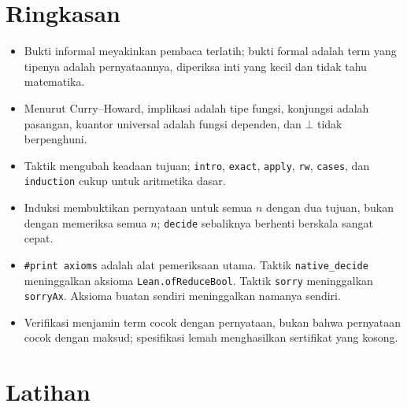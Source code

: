 \section{Ringkasan}

\begin{ringkasan}
\begin{itemize}
  \item Bukti informal meyakinkan pembaca terlatih; bukti formal adalah term yang tipenya adalah
        pernyataannya, diperiksa inti yang kecil dan tidak tahu matematika.
  \item Menurut Curry--Howard, implikasi adalah tipe fungsi, konjungsi adalah pasangan, kuantor
        universal adalah fungsi dependen, dan $\bot$ tidak berpenghuni.
  \item Taktik mengubah keadaan tujuan; \texttt{intro}, \texttt{exact}, \texttt{apply},
        \texttt{rw}, \texttt{cases}, dan \texttt{induction} cukup untuk aritmetika dasar.
  \item Induksi membuktikan pernyataan untuk semua $n$ dengan dua tujuan, bukan dengan memeriksa
        semua $n$; \texttt{decide} sebaliknya berhenti berskala sangat cepat.
  \item \texttt{\#print axioms} adalah alat pemeriksaan utama. Taktik \texttt{native\_decide}
        meninggalkan aksioma \texttt{Lean.ofReduceBool}. Taktik \texttt{sorry} meninggalkan
        \texttt{sorryAx}. Aksioma buatan sendiri meninggalkan namanya sendiri.
  \item Verifikasi menjamin term cocok dengan pernyataan, bukan bahwa pernyataan cocok dengan
        maksud; spesifikasi lemah menghasilkan sertifikat yang kosong.
\end{itemize}
\end{ringkasan}

\section{Latihan}

